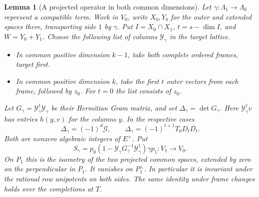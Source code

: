 \documentclass[a4paper,11pt]{article}
\newtheorem{lemma}[proposition]{Lemma}
\theoremstyle{definition}
\theoremstyle{remark}
\numberwithin{equation}{section}
\begin{document}
\begin{lemma}[A projected operator in both common dimensions]
\leavevmode\label{lem:positiveadjugate641}
Let \(\gamma:\Lambda_1\to\Lambda_0\) represent a compatible
term. Work in \(V_0\), write \(X_b,Y_b\) for the outer and
extended spaces there, transporting side \(1\) by \(\gamma\).
Put \(I=X_0\cap X_1\), \(t=s-\dim I\), and \(W=Y_0+Y_1\).
Choose the following list of columns \(\mathcal Y_\gamma\) in
the target lattice.

\begin{itemize}
\item In common positive dimension \(k-1\), take both complete
ordered frames, target first.
\item In common positive dimension \(k\), take the first \(t\)
outer vectors from each frame, followed by \(z_0\). For \(t=0\)
the list consists of \(z_0\).
\end{itemize}

Let \(G_\gamma=\mathcal Y_\gamma^\dagger\mathcal Y_\gamma\) be
their Hermitian Gram matrix, and set \(\Delta_\gamma=\det G_\gamma\).
Here \(\mathcal Y_\gamma^\dagger v\) has entries \(h(y,v)\) for
the columns \(y\). In the respective cases
\[
 \Delta_\gamma=(-1)^d\mathcal G,\qquad
 \Delta_\gamma=(-1)^{t+1}T_0D_t\overline{D_t}.
\]
Both are nonzero algebraic integers of \(E^+\). Put
\[
 S_\gamma=p_0
   (1-\mathcal Y_\gamma G_\gamma^{-1}\mathcal Y_\gamma^\dagger)
                   \gamma p_1 : V_1\longrightarrow V_0 .
\]
On \(P_1\) this is the isometry of the two projected common
spaces, extended by zero on the perpendicular in \(P_1\).
It vanishes on \(P_1^\perp\). In particular it is invariant
under the rational row unipotents on both sides. The same
identity under frame changes holds over the completions at \(T\).
\end{lemma}
\end{document}
